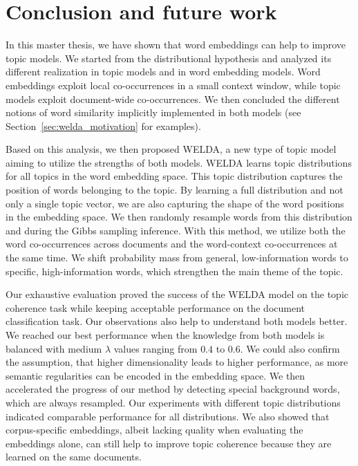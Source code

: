\documentclass[
        a4paper,
        titlepage,
        twoside,
        parskip,
        numbers=noenddot
        ]{scrbook}
\theoremstyle{break}
\begin{document}
\chapter{Conclusion and future work}
\label{sec:conclusion}

In this master thesis, we have shown that word embeddings can help to improve topic models.
We started from the distributional hypothesis and analyzed its different realization in topic models and in word embedding models.
Word embeddings exploit local co-occurrences in a small context window, while topic models exploit document-wide co-occurrences.
We then concluded the different notions of word similarity implicitly implemented in both models (see Section~\ref{sec:welda_motivation} for examples).

Based on this analysis, we then proposed WELDA, a new type of topic model aiming to utilize the strengths of both models.
WELDA learns topic distributions for all topics in the word embedding space.
This topic distribution captures the position of words belonging to the topic.
By learning a full distribution and not only a single topic vector, we are also capturing the shape of the word positions in the embedding space.
We then randomly resample words from this distribution and during the Gibbs sampling inference.
With this method, we utilize both the word co-occurrences across documents and the word-context co-occurrences at the same time.
We shift probability mass from general, low-information words to specific, high-information words, which strengthen the main theme of the topic.

Our exhaustive evaluation proved the success of the WELDA model on the topic coherence task while keeping acceptable performance on the document classification task.
Our observations also help to understand both models better.
We reached our best performance when the knowledge from both models is balanced with medium $\lambda$ values ranging from $0.4$ to $0.6$.
We could also confirm the assumption, that higher dimensionality leads to higher performance, as more semantic regularities can be encoded in the embedding space.
We then accelerated the progress of our method by detecting special background words, which are always resampled.
Our experiments with different topic distributions indicated comparable performance for all distributions. %
We also showed that corpus-specific embeddings, albeit lacking quality when evaluating the embeddings alone, can still help to improve topic coherence because they are learned on the same documents.
\end{document}
